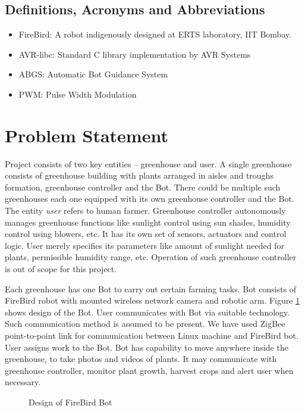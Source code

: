 \documentclass[a4paper, 12pt]{article}
\begin{document}
\subsection{Definitions, Acronyms and Abbreviations}
\begin{itemize}
 \item FireBird: A robot indigenously designed at ERTS laboratory, IIT Bombay. \cite{eyantra}
 \item AVR-libc: Standard C library implementation by AVR Systems
 \item ABGS: Automatic Bot Guidance System
 \item PWM: Pulse Width Modulation
\end{itemize}

\section{Problem Statement}
Project consists of two key entities -- greenhouse and user. A single greenhouse consists of greenhouse building with
plants arranged in aisles and troughs formation, greenhouse controller and the Bot. There could be multiple such 
greenhouses each one equipped with its own greenhouse controller and the Bot. The entity \emph{user} refers to human farmer.
Greenhouse controller autonomously manages greenhouse functions like sunlight control using sun shades, humidity control using
blowers, etc. It has its own set of sensors, actuators and control logic. User merely specifies its parameters 
like amount of sunlight needed for plants, permissible humidity range, etc. Operation of such greenhouse 
controller is out of scope for this project.

Each greenhouse has one Bot to carry out certain farming tasks. Bot consists of FireBird robot with mounted 
wireless network camera and robotic arm. Figure \ref{fig-bot} shows design of the Bot.
User communicates with Bot via suitable technology. Such communication method is assumed to be 
present. We have used ZigBee point-to-point link for communication between Linux machine and FireBird bot.
User assigns work to the Bot. Bot has capability to move anywhere inside the greenhouse, to take photos and 
videos of plants. It may communicate with greenhouse controller, monitor plant growth, harvest crops and 
alert user when necessary.

\begin{figure}

\caption{Design of FireBird Bot}
\label{fig-bot}
\end{figure}
\end{document}
